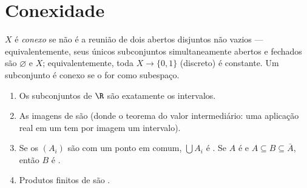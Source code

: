 \section{Conexidade}

\begin{definition}\label{def:b3:topology:connected}
$X$ é \emph{conexo} se não é a reunião de dois
abertos disjuntos não vazios --- equivalentemente, seus únicos
subconjuntos simultaneamente abertos e fechados são $\varnothing$ e $X$;
equivalentemente, toda  $X \to \{0, 1\}$ (discreto) é constante.
Um subconjunto é conexo se o for como subespaço.
\end{definition}

\begin{theorem}\label{thm:b3:topology:connectedbasics}
\begin{enumerate}
  \item Os subconjuntos  de $\R$ são exatamente os
        intervalos.
  \item As imagens  de  são  (donde o teorema
        do valor intermediário: uma aplicação real  em um
         tem por imagem um intervalo).
  \item Se os $(A_i)$ são  com um ponto em comum, $\bigcup
        A_i$ é
        . Se $A$ é  e $A \subseteq
        B \subseteq \bar A$, então $B$ é .
  \item Produtos finitos de  são .
\end{enumerate}
\end{theorem}

